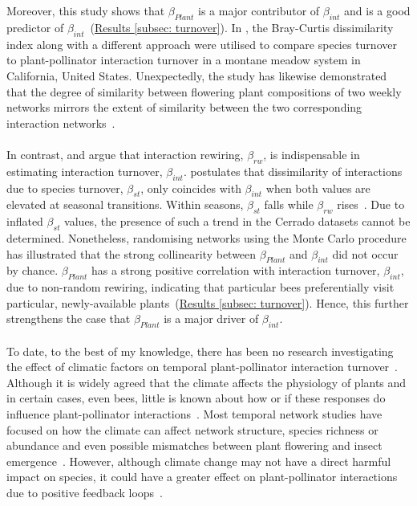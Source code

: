 \documentclass[11pt]{article}
\begin{document}
\\
\\
Moreover, this study shows that $\beta_{Plant}$ is a major contributor of $\beta_{int}$ and is a good predictor of $\beta_{int}$~(\hyperref[subsec: turnover]{Results \ref{subsec: turnover}}). In \cite{Alarcon2008}, the Bray-Curtis dissimilarity index along with a different approach were utilised to compare species turnover to plant-pollinator interaction turnover in a montane meadow system in California, United States. Unexpectedly, the study has likewise demonstrated that the degree of similarity between flowering plant compositions of two weekly networks mirrors the extent of similarity between the two corresponding interaction networks~\citep{Alarcon2008}. \\
\\
In contrast, \cite{Poisot2015} and \cite{CaraDonna2017} argue that interaction rewiring, $\beta_{rw}$, is indispensable in estimating interaction turnover, $\beta_{int}$. \cite{CaraDonna2017} postulates that dissimilarity of interactions due to species turnover, $\beta_{st}$, only coincides with $\beta_{int}$ when both values are elevated at seasonal transitions. Within seasons, $\beta_{st}$ falls while $\beta_{rw}$ rises~\citep{CaraDonna2017}. Due to inflated $\beta_{st}$ values, the presence of such a trend in the Cerrado datasets cannot be determined. Nonetheless, randomising networks using the Monte Carlo procedure has illustrated that the strong collinearity between $\beta_{Plant}$ and $\beta_{int}$ did not occur by chance. $\beta_{Plant}$ has a strong positive correlation with interaction turnover, $\beta_{int}$, due to non-random rewiring, indicating that particular bees preferentially visit particular, newly-available plants~(\hyperref[subsec: turnover]{Results \ref{subsec: turnover}}). Hence, this further strengthens the case that $\beta_{Plant}$ is a major driver of $\beta_{int}$.\\
\\
To date, to the best of my knowledge, there has been no research investigating the effect of climatic factors on temporal plant-pollinator interaction turnover~\citep{Burkle2011, Scaven2013}. Although it is widely agreed that the climate affects the physiology of plants and in certain cases, even bees, little is known about how or if these responses do influence plant-pollinator interactions~\citep{Hughes2000, Parmesan2003}. Most temporal network studies have focused on how the climate can affect network structure, species richness or abundance and even possible mismatches between plant flowering and insect emergence~\citep{BASILIO2006, Alarcon2008, MartinGonzalez2009, Schweiger2010}. However, although climate change may not have a direct harmful impact on species, it could have a greater effect on plant-pollinator interactions due to positive feedback loops~\citep{Hegland2009, Scaven2013}. \\
\end{document}
